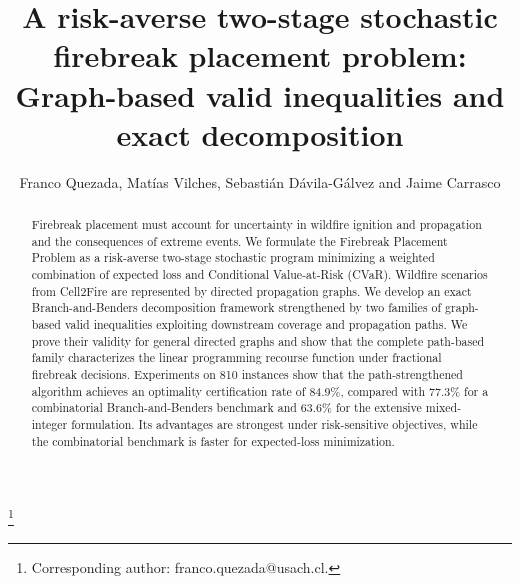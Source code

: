 \documentclass{itor}
\begin{document}
\title{A risk-averse two-stage stochastic firebreak placement problem:
Graph-based valid inequalities and exact decomposition}

\author[Quezada et al.]{Franco Quezada, Mat\'ias Vilches, Sebasti\'an D\'avila-G\'alvez and Jaime Carrasco}

\thanks{\affmark{$\ast$}Corresponding author: franco.quezada@usach.cl.}

\begin{abstract}
Firebreak placement must account for uncertainty in wildfire ignition and propagation and the consequences of extreme events. We formulate the Firebreak Placement Problem as a risk-averse two-stage stochastic program minimizing a weighted combination of expected loss and Conditional Value-at-Risk (CVaR). Wildfire scenarios from Cell2Fire are represented by directed propagation graphs. We develop an exact Branch-and-Benders decomposition framework strengthened by two families of graph-based valid inequalities exploiting downstream coverage and propagation paths. We prove their validity for general directed graphs and show that the complete path-based family characterizes the linear programming recourse function under fractional firebreak decisions. Experiments on 810 instances show that the path-strengthened algorithm achieves an optimality certification rate of 84.9\%, compared with 77.3\% for a combinatorial Branch-and-Benders benchmark and 63.6\% for the extensive mixed-integer formulation. Its advantages are strongest under risk-sensitive objectives, while the combinatorial benchmark is faster for expected-loss minimization. 
\end{abstract}
\maketitle
\end{document}
